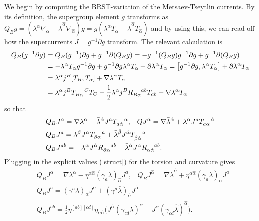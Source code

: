 \documentclass[12pt]{article}
\def\be{\begin{equation}}
\def\ee{\end{equation}}
\numberwithin{equation}{section}
\begin{document}
We begin by computing the BRST-variation of the Metsaev-Tseytlin currents. By its definition, the supergroup element $g$ transforms as $Q_B g = (\lambda^\alpha \nabla_\alpha + \bar{\lambda}^{\hat{\alpha}} \bar{\nabla}_{\hat{\alpha}})g =  g(\lambda^\alpha T_\alpha + \bar{\lambda}^{\hat{\alpha}} T_{\hat{\alpha}})$ and by using this, we can read off how the supercurrents $J = g^{-1} \partial g$ transform. The relevant calculation is
\be
\begin{aligned}
	Q_B(g^{-1} \partial g) &= Q_B(g^{-1}) \partial g + g^{-1} \partial (Q_B g) = -g^{-1} (Q_B g) g^{-1} \partial g + g^{-1} \partial (Q_B g) \\
			     &= - \lambda^\alpha T_\alpha g^{-1} \partial g + g^{-1} \partial g \lambda^\alpha T_\alpha + \partial \lambda^\alpha T_\alpha = \comm{g^{-1} \partial g}{\lambda^\alpha T_\alpha} + \partial \lambda^\alpha T_\alpha \\
			     &= \lambda^\alpha j^B \comm{T_B}{T_\alpha} + \nabla \lambda^\alpha T_\alpha \\
			     &= \lambda^\alpha j^B T\indices{_{B\alpha}^C} T_C - \frac{1}{2} \lambda^\alpha j^B R\indices{_{B\alpha}^{ab}} T_{ab} + \nabla \lambda^\alpha T_\alpha
\label{Qg}
\end{aligned}
\ee
so that
\begin{align}
	&Q_B J^\alpha = \nabla \lambda^\alpha + \bar{\lambda}^{\hat{\alpha}} J^a T\indices{_{a\hat{\alpha}}^\alpha}, \,\,\,\,\, Q J^{\hat{\alpha}} = \nabla \bar{\lambda}^{\hat{\alpha}} + \lambda^\alpha J^a T\indices{_{a \alpha}^{\hat{\alpha}}} \\
	& Q_B J^a = \lambda^\beta J^\alpha T\indices{_{\beta \alpha}^a} + \bar{\lambda}^{\hat{\beta}} J^{\hat{\alpha}} T\indices{_{\hat{\beta} \hat{\alpha}}^a} \\
	& Q_B J^{ab} =  -\lambda^\alpha J^{\hat{\alpha}} R\indices{_{\hat{\alpha}\alpha}^{ab}} - \bar{\lambda}^{\hat{\alpha}} J^\alpha R\indices{_{\alpha \hat{\alpha}}^{ab}}.
\end{align}
Plugging in the explicit values (\ref{struct}) for the torsion and curvature gives
\begin{align}
	&Q_B J^\alpha = \nabla \lambda^\alpha - \eta^{\alpha \hat{\alpha}} (\gamma_a \bar{\lambda})_{\hat{\alpha}} J^a , \,\,\,\,\, Q_B J^{\hat{\alpha}} = \nabla \bar{\lambda}^{\hat{\alpha}} +  \eta^{\alpha \hat{\alpha}} (\gamma _a\lambda)_{\alpha} J^a \\
	& Q_B J^a = (\gamma^a \lambda)_\alpha J^\alpha + (\gamma^a \bar{\lambda})_{\hat{\alpha}} J^{\hat{\alpha}}\\
	& Q_B J^{ab} =  \frac{1}{2}\eta^{[ab][cd]}\eta_{\alpha \hat{\alpha}} \big(J^{\hat{\alpha}}(\gamma_{cd}\lambda)^\alpha - J^\alpha (\gamma_{cd} \hat{\lambda})^{\hat{\alpha}}\big).
\end{align}
\end{document}
